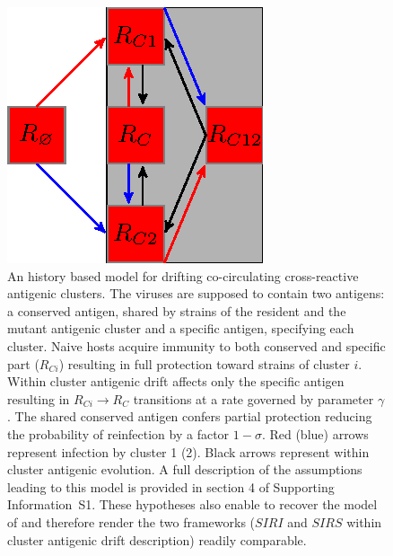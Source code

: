 \begin{figure}[!htbp]
\begin{center}
  \includegraphics[width=0.3\linewidth]{graphs/article1/figure_7.eps}
\end{center}
\caption{ An history based model for drifting co-circulating
    cross-reactive antigenic clusters. The viruses are supposed to
  contain two antigens: a conserved antigen, shared by strains of the
  resident and the mutant antigenic cluster and a specific antigen,
  specifying each cluster. Naive hosts acquire immunity to both
  conserved and specific part ($R_{Ci}$) resulting in full protection
  toward strains of cluster $i$. Within cluster antigenic drift
  affects only the specific antigen resulting in $R_{Ci} \to R_C$
  transitions at a rate governed by parameter $\gamma$. The shared
  conserved antigen confers partial protection reducing the
  probability of reinfection by a factor $1-\sigma$. Red (blue) arrows
  represent infection by cluster 1 (2). Black arrows represent within
  cluster antigenic evolution. A full description of the assumptions
  leading to this model is provided in section 4 of Supporting
  Information~S1. These hypotheses also enable to recover the model of
  \cite{Goekaydin2007} and therefore render the two frameworks ($SIRI$
  and $SIRS$ within cluster antigenic drift description) readily
  comparable.}
  \label{fig:model_sirs}
\end{figure}



